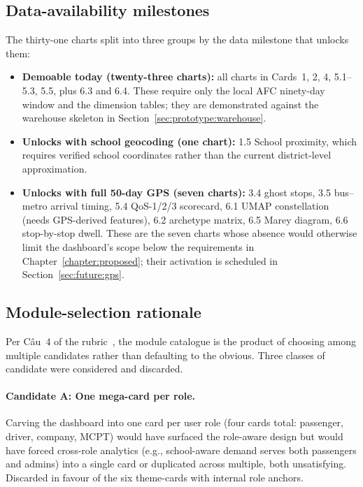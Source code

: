 \subsection{Data-availability milestones}
\label{sec:proposed:milestones}

The thirty-one charts split into three groups by the data
milestone that unlocks them:

\begin{itemize}
\item \textbf{Demoable today (twenty-three charts):} all charts
    in Cards~1, 2, 4, 5.1--5.3, 5.5, plus 6.3 and 6.4. These
    require only the local AFC ninety-day window and the
    dimension tables; they are demonstrated against the
    warehouse skeleton in
    Section~\ref{sec:prototype:warehouse}.
\item \textbf{Unlocks with school geocoding (one chart):} 1.5
    School proximity, which requires verified school coordinates
    rather than the current district-level approximation.
\item \textbf{Unlocks with full 50-day GPS (seven charts):} 3.4
    ghost stops, 3.5 bus--metro arrival timing, 5.4 QoS-1/2/3
    scorecard, 6.1 UMAP constellation (needs GPS-derived
    features), 6.2 archetype matrix, 6.5 Marey diagram, 6.6
    stop-by-stop dwell. These are the seven charts whose absence
    would otherwise limit the dashboard's scope below the
    requirements in Chapter~\ref{chapter:proposed}; their
    activation is scheduled in
    Section~\ref{sec:future:gps}.
\end{itemize}

\subsection{Module-selection rationale}
\label{sec:proposed:module_rationale}

Per Câu~4 of the rubric~\cite{rubric}, the module catalogue is
the product of choosing among multiple candidates rather than
defaulting to the obvious. Three classes of candidate were
considered and discarded.

\paragraph{Candidate A: One mega-card per role.}
Carving the dashboard into one card per user role (four cards
total: passenger, driver, company, MCPT) would have surfaced
the role-aware design but would have forced cross-role analytics
(e.g., school-aware demand serves both passengers and admins)
into a single card or duplicated across multiple, both
unsatisfying. Discarded in favour of the six theme-cards with
internal role anchors.

